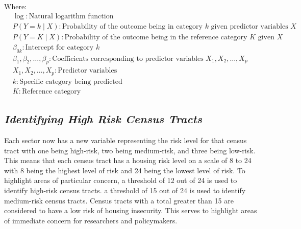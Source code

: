 Where:
\begin{align*}
    & \log: \text{Natural logarithm function} \\
    & P(Y = k \mid X): \text{Probability of the outcome being in category \(k\) given predictor variables \(X\)} \\
    & P(Y = K \mid X): \text{Probability of the outcome being in the reference category \(K\) given \(X\)} \\
    & \beta_{0k}: \text{Intercept for category \(k\)} \\
    & \beta_1, \beta_2, \dots, \beta_p: \text{Coefficients corresponding to predictor variables \(X_1, X_2, \dots, X_p\)} \\
    & X_1, X_2, \dots, X_p: \text{Predictor variables} \\
    & k: \text{Specific category being predicted} \\
    & K: \text{Reference category}
\end{align*}

\subsection{\textit{Identifying High Risk Census Tracts}}
Each sector now has a new variable representing the risk level for that census tract with one being high-risk, two being medium-risk, and three being low-risk. This means that each census tract has a housing risk level on a scale of 8 to 24 with 8 being the highest level of risk and 24 being the lowest level of risk. To highlight areas of particular concern, a threshold of 12 out of 24 is used to identify high-risk census tracts. a threshold of 15 out of 24 is used to identify medium-risk census tracts. Census tracts with a total greater than 15 are considered to have a low risk of housing insecurity. This serves to highlight areas of immediate concern for researchers and policymakers. 

\endinput